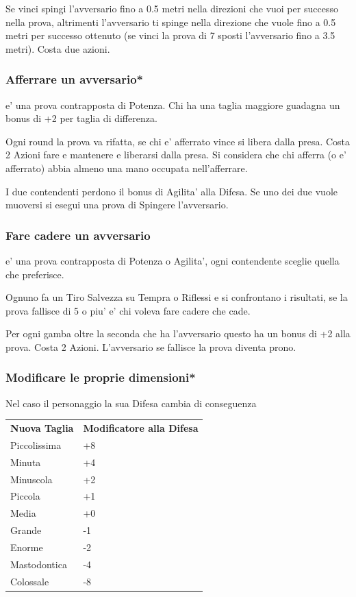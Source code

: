 \documentclass[a4paper,11pt,twoside,openany]{book}
\begin{document}
	Se vinci spingi l'avversario fino a 0.5 metri nella direzioni che vuoi per successo nella prova, altrimenti l'avversario ti spinge nella direzione che vuole fino a 0.5 metri per successo ottenuto (se vinci la prova di 7 sposti l'avversario fino a 3.5 metri).
	Costa due azioni.
	
	\subsubsection{Afferrare un avversario*} e' una prova contrapposta di Potenza. Chi ha una taglia maggiore guadagna un bonus di +2 per taglia di differenza.
	
	Ogni round la prova va rifatta, se chi e' afferrato vince si libera dalla presa. Costa 2 Azioni fare e mantenere e liberarsi dalla presa. Si considera che chi afferra (o e' afferrato) abbia almeno una mano occupata nell'afferrare.
	
	I due contendenti perdono il bonus di Agilita' alla Difesa. Se uno dei due vuole muoversi si esegui una prova di Spingere l'avversario.
	
	\subsubsection{Fare cadere un avversario} e' una prova contrapposta di Potenza o Agilita', ogni contendente sceglie quella che preferisce. 
	
	Ognuno fa un Tiro Salvezza su Tempra o Riflessi e si confrontano i risultati, se la prova fallisce di 5 o piu' e' chi voleva fare cadere che cade.
	
	Per ogni gamba oltre la seconda che ha l'avversario questo ha un bonus di +2 alla prova. Costa 2 Azioni. L'avversario se fallisce la prova diventa prono.
	
	\subsubsection{Modificare le proprie dimensioni*}
	
	Nel caso il personaggio  la sua Difesa cambia di conseguenza
	
	\bigskip
	
	\begin{tabular}{ll}
		\toprule
		\textbf{Nuova Taglia} & \textbf{Modificatore alla Difesa}\tabularnewline
		Piccolissima & +8\tabularnewline
		Minuta & +4\tabularnewline
		Minuscola & +2\tabularnewline
		Piccola & +1\tabularnewline
		Media & +0\tabularnewline
		Grande & -1\tabularnewline
		Enorme & -2\tabularnewline
		Mastodontica & -4\tabularnewline
		Colossale & -8\tabularnewline
		
	\end{tabular}
	
\end{document}
